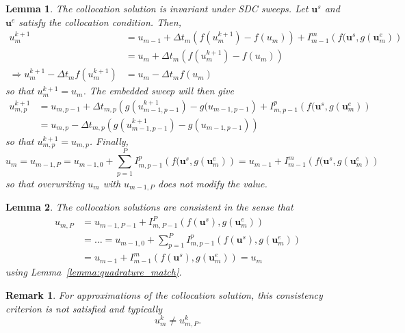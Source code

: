 \documentclass{article}
\newtheorem{remark}{Remark}
\newtheorem{lemma}{Lemma}
\newcommand{\ve}[1]{\mathbf{#1}}
\begin{document}
\begin{lemma}
The collocation solution is invariant under SDC sweeps. Let $\ve{u}^s$ and $\ve{u}^e$ satisfy the collocation condition.
Then,
\begin{align*}
	u^{k+1}_{m} &= u_{m-1}  + \Delta t_m \left( f(u^{k+1}_m) - f(u_m) \right) + I_{m-1}^{m}\left( f(\ve{u}^s, g(\ve{u}^e_m) \right) \\
		&= u_{m} + \Delta t_{m} \left( f(u^{k+1}_m) - f(u_m) \right) \\
	\Rightarrow u^{k+1}_m - \Delta t_m f(u^{k+1}_{m}) &= u_{m} - \Delta t_{m} f(u_m)
\end{align*}
so that $u^{k+1}_m = u_m$.
The embedded sweep will then give
\begin{align*}
	u^{k+1}_{m,p} &= u_{m,p-1} + \Delta t_{m,p} \left( g(u^{k+1}_{m-1,p-1}) - g(u_{m-1,p-1} \right) + I_{m,p-1}^{p} \left( f(\ve{u}^s, g(\ve{u}^e_m) \right) \\
				&= u_{m,p} - \Delta t_{m,p} \left( g(u^{k+1}_{m-1,p-1}) - g(u_{m-1,p-1}) \right)
\end{align*}
so that $u^{k+1}_{m,p} = u_{m,p}$.
Finally,
\begin{equation}
	u_{m} = u_{m-1,P} = u_{m-1,0} + \sum_{p=1}^{P} I_{m,p-1}^{p}\left( f(\ve{u}^s, g(\ve{u}^e_m) \right) = u_{m-1} + I_{m-1}^{m}\left( f(\ve{u}^s, g(\ve{u}^e_m) \right) 
\end{equation}
so that overwriting $u_{m}$ with $u_{m-1,P}$ does not modify the value.
\end{lemma}
%
%
%
\begin{lemma}
The collocation solutions are consistent in the sense that
\begin{align*}
	u_{m,P} &= u_{m-1,P-1} + I_{m,P-1}^{P}\left( f(\ve{u}^{s}) , g(\ve{u}^{e}_m) \right) \\
			&= \ldots = u_{m-1,0} + \sum_{p=1}^{P} I_{m,p-1}^{p}\left( f(\ve{u}^{s}) , g(\ve{u}^{e}_m) \right) \\
			&= u_{m-1} + I_{m-1}^{m}\left( f(\ve{u}^{s}) , g(\ve{u}^{e}_m) \right) = u_{m}
\end{align*}
using Lemma~\ref{lemma:quadrature_match}.
\end{lemma}
%
%
\begin{remark}
For approximations of the collocation solution, this consistency criterion is not satisfied and typically
\begin{equation}
	u_{m}^{k} \neq u_{m,P}^{k}.
\end{equation}
\end{remark}
\end{document}
